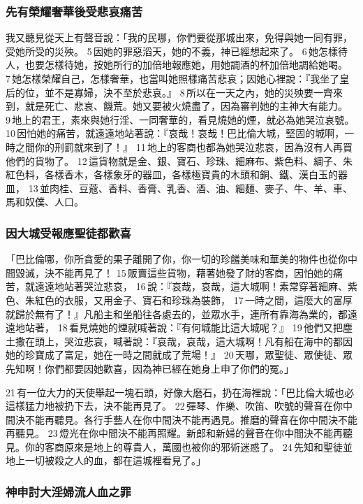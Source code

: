\subsubsection{先有榮耀奢華後受悲哀痛苦}
我又聽見從天上有聲音說：「我的民哪，你們要從那城出來，免得與她一同有罪，受她所受的災殃。 5 因她的罪惡滔天，她的不義，神已經想起來了。 6 她怎樣待人，也要怎樣待她，按她所行的加倍地報應她，用她調酒的杯加倍地調給她喝。 7 她怎樣榮耀自己，怎樣奢華，也當叫她照樣痛苦悲哀；因她心裡說：『我坐了皇后的位，並不是寡婦，決不至於悲哀。』 8 所以在一天之內，她的災殃要一齊來到，就是死亡、悲哀、饑荒。她又要被火燒盡了，因為審判她的主神大有能力。 9 地上的君王，素來與她行淫、一同奢華的，看見燒她的煙，就必為她哭泣哀號。 10 因怕她的痛苦，就遠遠地站著說：『哀哉！哀哉！巴比倫大城，堅固的城啊，一時之間你的刑罰就來到了！』 11 地上的客商也都為她哭泣悲哀，因為沒有人再買他們的貨物了。 12 這貨物就是金、銀、寶石、珍珠、細麻布、紫色料、綢子、朱紅色料，各樣香木，各樣象牙的器皿，各樣極寶貴的木頭和銅、鐵、漢白玉的器皿， 13 並肉桂、豆蔻、香料、香膏、乳香、酒、油、細麵、麥子、牛、羊、車、馬和奴僕、人口。

\subsubsection{因大城受報應聖徒都歡喜}
「巴比倫哪，你所貪愛的果子離開了你，你一切的珍饈美味和華美的物件也從你中間毀滅，決不能再見了！ 15 販賣這些貨物，藉著她發了財的客商，因怕她的痛苦，就遠遠地站著哭泣悲哀， 16 說：『哀哉，哀哉，這大城啊！素常穿著細麻、紫色、朱紅色的衣服，又用金子、寶石和珍珠為裝飾， 17 一時之間，這麼大的富厚就歸於無有了！』凡船主和坐船往各處去的，並眾水手，連所有靠海為業的，都遠遠地站著， 18 看見燒她的煙就喊著說：『有何城能比這大城呢？』 19 他們又把塵土撒在頭上，哭泣悲哀，喊著說：『哀哉，哀哉，這大城啊！凡有船在海中的都因她的珍寶成了富足，她在一時之間就成了荒場！』 20 天哪，眾聖徒、眾使徒、眾先知啊！你們都要因她歡喜，因為神已經在她身上申了你們的冤。」

21 有一位大力的天使舉起一塊石頭，好像大磨石，扔在海裡說：「巴比倫大城也必這樣猛力地被扔下去，決不能再見了。 22 彈琴、作樂、吹笛、吹號的聲音在你中間決不能再聽見。各行手藝人在你中間決不能再遇見。推磨的聲音在你中間決不能再聽見。 23 燈光在你中間決不能再照耀。新郎和新婦的聲音在你中間決不能再聽見。你的客商原來是地上的尊貴人，萬國也被你的邪術迷惑了。 24 先知和聖徒並地上一切被殺之人的血，都在這城裡看見了。」

\subsubsection{神申討大淫婦流人血之罪}

